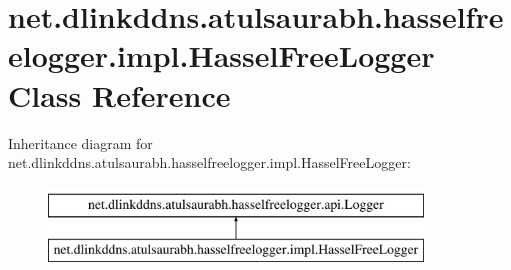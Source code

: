\hypertarget{classnet_1_1dlinkddns_1_1atulsaurabh_1_1hasselfreelogger_1_1impl_1_1_hassel_free_logger}{}\section{net.\+dlinkddns.\+atulsaurabh.\+hasselfreelogger.\+impl.\+Hassel\+Free\+Logger Class Reference}
\label{classnet_1_1dlinkddns_1_1atulsaurabh_1_1hasselfreelogger_1_1impl_1_1_hassel_free_logger}
Inheritance diagram for net.\+dlinkddns.\+atulsaurabh.\+hasselfreelogger.\+impl.\+Hassel\+Free\+Logger\+:\begin{figure}[H]
\begin{center}
\leavevmode
\includegraphics[height=2.000000cm]{classnet_1_1dlinkddns_1_1atulsaurabh_1_1hasselfreelogger_1_1impl_1_1_hassel_free_logger}
\end{center}
\end{figure}
